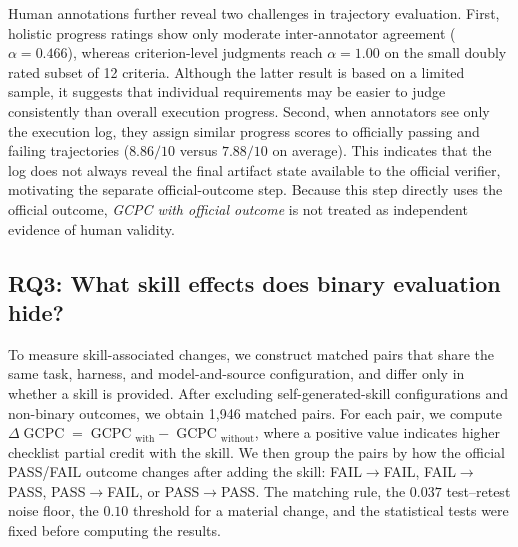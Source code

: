 \documentclass[sigconf,nonacm]{acmart}
\DeclareMathOperator{\cpc}{GCPC}
\begin{document}
Human annotations further reveal two challenges in trajectory evaluation.
First, holistic progress ratings show only moderate inter-annotator agreement
($\alpha=0.466$), whereas criterion-level judgments reach $\alpha=1.00$ on
the small doubly rated subset of 12 criteria. Although the latter result is
based on a limited sample, it suggests that individual requirements may be
easier to judge consistently than overall execution progress. Second, when
annotators see only the execution log, they assign similar progress scores to
officially passing and failing trajectories ($8.86/10$ versus $7.88/10$ on
average). This indicates that the log does not always reveal the final
artifact state available to the official verifier, motivating the separate
official-outcome step. Because this step directly uses the official outcome,
\emph{GCPC with official outcome} is not treated as independent evidence of human
validity.



\subsection{RQ3: What skill effects does binary evaluation hide?}
\label{sec:skilleffect}

To measure skill-associated changes, we construct matched pairs that share the
same task, harness, and model-and-source configuration, and differ only in
whether a skill is provided. After excluding self-generated-skill
configurations and non-binary outcomes, we obtain 1{,}946 matched pairs. For
each pair, we compute
$\Delta\cpc{}=\cpc{}_{\mathrm{with}}-\cpc{}_{\mathrm{without}}$, where a
positive value indicates higher checklist partial credit with the skill. We then group the pairs by how the official PASS/FAIL outcome changes after
adding the skill: FAIL$\rightarrow$FAIL, FAIL$\rightarrow$PASS,
PASS$\rightarrow$FAIL, or PASS$\rightarrow$PASS. The matching rule, the
$0.037$ test--retest noise floor, the $0.10$ threshold for a material change,
and the statistical tests were fixed before computing the results.
\end{document}
